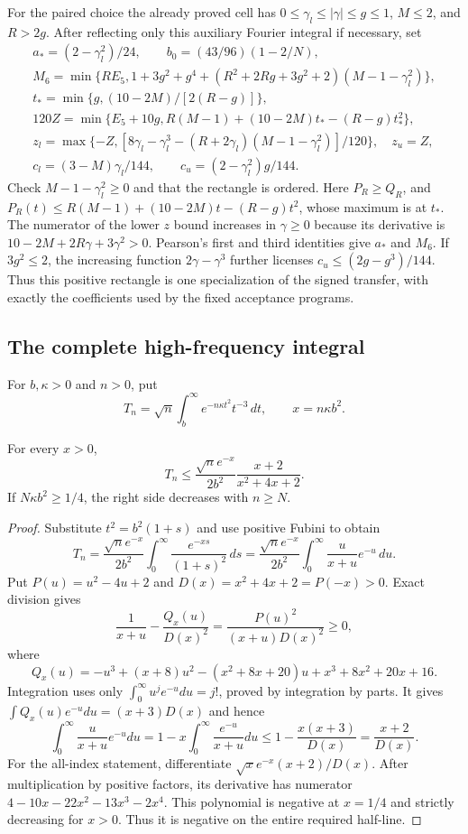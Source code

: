 For the paired choice the already proved cell has
$0\le\gamma_l\le|\gamma|\le g\le1$, $M\le2$, and $R>2g$. After reflecting only this auxiliary Fourier integral if necessary, set
\begin{gather*}
 a_*=(2-\gamma_l^2)/24,\qquad b_0=(43/96)(1-2/N),\\
 M_6=\min\{RE_5,1+3g^2+g^4+(R^2+2Rg+3g^2+2)(M-1-\gamma_l^2)\},\\
 t_*=\min\{g,(10-2M)/[2(R-g)]\},\\
 120Z=\min\{E_5+10g,R(M-1)+(10-2M)t_*-(R-g)t_*^2\},\\
 z_l=\max\{-Z,[8\gamma_l-\gamma_l^3-(R+2\gamma_l)(M-1-\gamma_l^2)]/120\},
 \quad z_u=Z,\\
 c_l=(3-M)\gamma_l/144,\qquad c_u=(2-\gamma_l^2)g/144.
\end{gather*}
Check $M-1-\gamma_l^2\ge0$ and that the rectangle is ordered. Here
$P_R\ge Q_R$, and $P_R(t)\le R(M-1)+(10-2M)t-(R-g)t^2$,
whose maximum is at $t_*$. The numerator of the lower $z$ bound increases
in $\gamma\ge0$ because its derivative is
$10-2M+2R\gamma+3\gamma^2>0$. Pearson's first and third identities
give $a_*$ and $M_6$. If $3g^2\le2$, the increasing function
$2\gamma-\gamma^3$ further licenses $c_u\le(2g-g^3)/144$.
Thus this positive rectangle is one specialization of the signed transfer,
with exactly the coefficients used by the fixed acceptance programs.

\subsection{The complete high-frequency integral}
For $b,\kappa>0$ and $n>0$, put
\[
 T_n=\sqrt n\int_b^\infty e^{-n\kappa t^2}t^{-3}\,dt,
 \qquad x=n\kappa b^2.
\]
\begin{lemma}
For every $x>0$,
\[
 T_n\le\frac{\sqrt n e^{-x}}{2b^2}
                  \frac{x+2}{x^2+4x+2}.
\]
If $N\kappa b^2\ge1/4$, the right side decreases with $n\ge N$.
\end{lemma}
\begin{proof}
Substitute $t^2=b^2(1+s)$ and use positive Fubini to obtain
\[
 T_n=\frac{\sqrt n e^{-x}}{2b^2}
 \int_0^\infty\frac{e^{-xs}}{(1+s)^2}\,ds
 =\frac{\sqrt n e^{-x}}{2b^2}
 \int_0^\infty\frac{u}{x+u}e^{-u}\,du.
\]
Put $P(u)=u^2-4u+2$ and $D(x)=x^2+4x+2=P(-x)>0$.
Exact division gives
\[
 \frac1{x+u}-\frac{Q_x(u)}{D(x)^2}
       =\frac{P(u)^2}{(x+u)D(x)^2}\ge0,
\]
where
\[
 Q_x(u)=-u^3+(x+8)u^2-(x^2+8x+20)u
                  +x^3+8x^2+20x+16.
\]
Integration uses only $\int_0^\infty u^j e^{-u}du=j!$, proved by
integration by parts. It gives
$\int Q_x(u)e^{-u}du=(x+3)D(x)$ and hence
\[
 \int_0^\infty\frac{u}{x+u}e^{-u}du
 =1-x\int_0^\infty\frac{e^{-u}}{x+u}du
 \le1-\frac{x(x+3)}{D(x)}=\frac{x+2}{D(x)}.
\]
For the all-index statement, differentiate
$\sqrt{x}e^{-x}(x+2)/D(x)$. After multiplication by positive factors,
its derivative has numerator
$4-10x-22x^2-13x^3-2x^4$. This polynomial is negative at $x=1/4$
and strictly decreasing for $x>0$. Thus it is negative on the entire
required half-line.
\end{proof}


